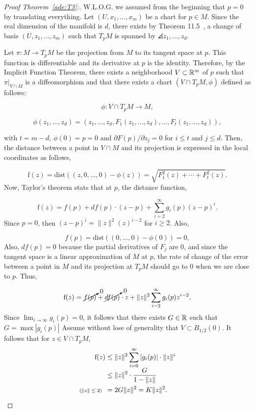 \begin{proof}[Proof Theorem~\ref{ade:T3}:]\label{ade:T3P}
  W.L.O.G. we assumed from the beginning that $p=0$ by translating everything. Let $(U, x_1, \ldots, x_m)$ be a chart for $p \in M$. Since the real dimension of the manifold is $d$, there exists by Theorem 11.5~\cite{tu2011manifolds}, a change of basis $(U, z_1, \ldots, z_m)$ such that $T_p M$ is spanned by $\angles{z_1,\ldots, z_d}$.
  
  \vspace*{1em}
  
  Let $\pi : M \to T_p M$ be the projection from $M$ to its tangent space at $p$. This function is differentiable and its derivative at $p$ is the identity. Therefore, by the Implicit Function Theorem, there exists a neighborhood $V \subset \mathbb{R}^m$ of $p$ such that $\pi |_{V\cap M}$ is a diffeomorphism and that there exists a chart $(V\cap T_p M, \phi)$ defined as follows:
  
  \[ \phi : V\cap T_p M \to M,\] 

  \begin{equation}\label{ade:phi}
    \phi(z_1, \ldots, z_d) = (z_1,\ldots, z_d, F_1(z_1,\ldots, z_d),\ldots, F_{t}(z_1,\ldots, z_d)),
  \end{equation}
  
  with $t = m-d$, $\phi(0) = p = 0$ and $\partial F(p)/ \partial z_j = 0$ for $i \leq t$ and $j \leq d$. Then, the distance between a point in $V\cap M$ and its projection is expressed in the local coordinates as follows,

  \[ \text{f}(z) = \text{dist}((z,0,\ldots,0) - \phi(z)) = \sqrt{F_1^2(z)+ \cdots + F_t^2(z)}. \]
  Now, Taylor's theorem stats that at $p$, the distance function,

  \[ \text{f}(z) = f(p) + df(p) \cdot (z-p) + \sum_{i = 2}^{\infty} g_i(p) {(z-p)}^i. \]
  Since $p = 0$, then ${(z-p)}^i = \|z\|^2 {(z)}^{i-2}$ for $i \geq 2$. Also,

  \[ f(p) = \text{dist}((0,\ldots, 0)- \phi(0)) = 0, \]
  Also, $df(p) = 0$ because the partial derivatives of $F_j$ are 0, and since the tangent space is a linear approximation of $M$ at $p$, the rate of change of the error between a point in $M$ and its projection at $T_p M$ should go to 0 when we are close to $p$. Thus,

  \[ \text{f}(z) = \cancelto{0}{f(p)} + \cancelto{0}{df(p)} \cdot z + \|z\|^2 \sum_{i = 2}^{\infty} g_i(p) z^{i-2}. \]
  Since $\lim_{i\to\infty} g_i(p) = 0$, it follows that there exists $G \in \mathbb{R}$ such that $G = \max |g_i(p)|$
  Assume without lose of generality that $V \subset B_{1/2}(0)$. It follows that for $z \in V\cap T_p M$,
  \[ \everymath{\displaystyle}\arraycolsep=1.4pt\def\arraystretch{1.5} 
  \begin{array}{rcl}
    \text{f}(z) & \leq & \|z\|^2 \sum_{i = 0}^{\infty} |g_i(p)| \cdot \|z\|^i\\
    & \leq & \|z\|^2 \cdot \frac{G}{1-\|z\|}\\
    \text{\scriptsize ($\|z\| \leq 2$)}\hspace*{0.5em} & = & 2G\|z\|^2 = K\|z\|^2.
  \end{array} \] 


\end{proof}
